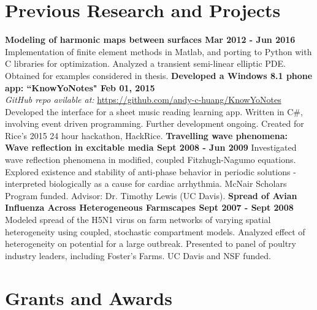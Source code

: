 \documentclass[margin,line]{res}
\begin{document}
\begin{resume}
\section{\sc Previous Research and Projects}

{\bf Modeling of harmonic maps between surfaces \hfill Mar 2012 - Jun 2016}\\
Implementation of finite element methods in Matlab, and porting to Python with C libraries for optimization. Analyzed a transient semi-linear elliptic PDE. Obtained for examples considered in thesis.
\vskip -5pt
{\bf Developed a Windows 8.1 phone app: ``KnowYoNotes" \hfill Feb 01, 2015}\\
\emph{GitHub repo avilable at: }\url{https://github.com/andy-c-huang/KnowYoNotes}\\
Developed the interface for a sheet music reading learning app. Written in C\#, involving event driven programming. Further development ongoing. Created for Rice's 2015 24 hour hackathon, HackRice.
\vskip -5pt
{\bf Travelling wave phenomena: Wave reflection in excitable media \hfill Sept 2008 - Jun 2009} \newline
Investigated wave reflection phenomena in modified, coupled Fitzhugh-Nagumo equations. Explored existence and stability of anti-phase behavior in periodic solutions - interpreted biologically as a cause for cardiac arrhythmia. McNair Scholars Program funded. Advisor: Dr. Timothy Lewis (UC Davis).
\vskip -5pt
{\bf Spread of Avian Influenza Across Heterogeneous Farmscapes \hfill Sept 2007 - Sept 2008} \\
Modeled spread of the H5N1 virus on farm networks of varying spatial heterogeneity using coupled, stochastic compartment models. Analyzed effect of heterogeneity on potential for a large outbreak. Presented to panel of poultry industry leaders, including Foster's Farms. UC Davis and NSF funded.

\section{\sc Grants and Awards}
\begin{enumerate}


\end{enumerate}
\end{resume}
\end{document}
